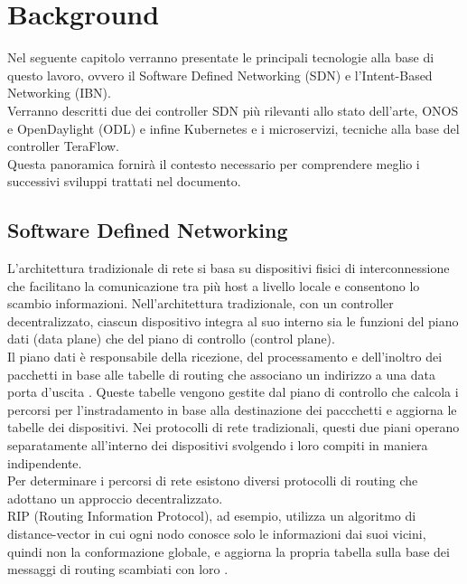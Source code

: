 \chapter{Background}
\label{cap:contesto}
Nel seguente capitolo verranno presentate le principali tecnologie alla base di questo lavoro, ovvero il Software Defined Networking (SDN) e l'Intent-Based Networking (IBN). 
\\Verranno descritti due dei controller SDN più rilevanti allo stato dell'arte, ONOS \cite{ONOS} e OpenDaylight (ODL) \cite{ODL} e infine Kubernetes e i microservizi, tecniche alla base del controller TeraFlow.
\\Questa panoramica fornirà il contesto necessario per comprendere meglio i successivi sviluppi trattati nel documento.
\section{Software Defined Networking}
\label{ch:SDN}
L'architettura tradizionale di rete si basa su dispositivi fisici di interconnessione che facilitano la comunicazione tra più host a livello locale e consentono lo scambio informazioni.
Nell'architettura tradizionale, con un controller decentralizzato, ciascun dispositivo integra al suo interno sia le funzioni del piano dati (data plane) che del piano di controllo (control plane). 
\\Il piano dati è responsabile della ricezione, del processamento e dell'inoltro dei pacchetti in base alle tabelle di routing che associano un indirizzo a una data porta d'uscita \cite{tesiSDN:2020}. 
Queste tabelle vengono gestite dal piano di controllo che calcola i percorsi 
per l'instradamento in base alla destinazione dei paccchetti e aggiorna le tabelle dei dispositivi. 
Nei protocolli di rete tradizionali, questi due piani operano separatamente all'interno dei dispositivi svolgendo i loro compiti in maniera indipendente. 
\\Per determinare i percorsi di rete esistono diversi protocolli di routing che adottano un approccio decentralizzato.
\\RIP (Routing Information Protocol), ad esempio, utilizza un algoritmo di distance-vector in cui ogni nodo conosce solo le informazioni dai suoi vicini, quindi non la conformazione globale, e aggiorna la propria tabella sulla base dei messaggi di routing scambiati con loro \cite{rip}.
